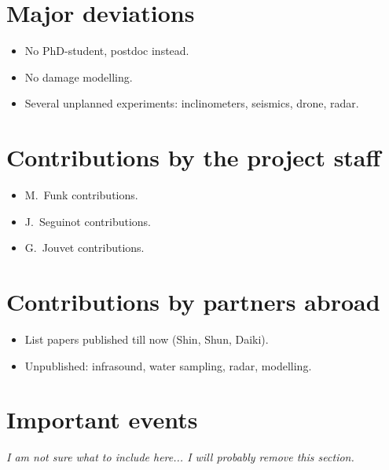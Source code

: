 \documentclass{article}
\begin{document}
\section{Major deviations}

\begin{itemize}
\item No PhD-student, postdoc instead.
\item No damage modelling.
\item Several unplanned experiments: inclinometers, seismics, drone, radar.
\end{itemize}

\section{Contributions by the project staff}

\begin{itemize}
\item M.~Funk contributions.
\item J.~Seguinot contributions.
\item G.~Jouvet contributions.
\end{itemize}

\section{Contributions by partners abroad}

\begin{itemize}
\item List papers published till now (Shin, Shun, Daiki).
\item Unpublished: infrasound, water sampling, radar, modelling.
\end{itemize}

\section{Important events}

\emph{I am not sure what to include here...
      I will probably remove this section.}

\end{document}
